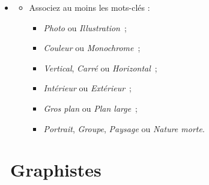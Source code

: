 \documentclass[12pt,nofoldmark,notumble]{leaflet}
\begin{document}
\begin{center}
  \setlength{\fboxsep}{0pt}%
  \setlength{\fboxrule}{0pt}%
\end{center}

\vspace*{\fill}

\begin{itemize}
  \item[]
  \begin{itemize}
  \item Associez au moins les mots-clés :

    \begin{itemize}
    \item \emph{Photo} ou \emph{Illustration} ;
    \item \emph{Couleur} ou \emph{Monochrome} ;
    \item \emph{Vertical}, \emph{Carré} ou \emph{Horizontal} ;
    \item \emph{Intérieur} ou \emph{Extérieur} ;
    \item \emph{Gros plan} ou \emph{Plan large} ;
    \item \emph{Portrait}, \emph{Groupe}, \emph{Paysage} ou \emph{Nature morte}.
    \end{itemize}
  \end{itemize}
\end{itemize}
\vspace*{\fill}
\clearpage

\section{\faPaintBrush  Graphistes}
\end{document}
